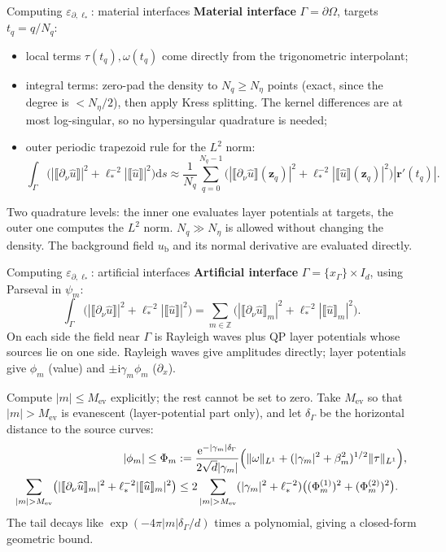 \documentclass[aspectratio=169]{beamer}
\newcommand{\ii}{\mathrm{i}}
\newcommand{\ee}{\mathrm{e}}
\newcommand{\dd}{\mathrm{d}}
\newcommand{\ZZ}{\mathbb{Z}}
\newcommand{\jump}[1]{\llbracket #1\rrbracket}
\newcommand{\eps}{\varepsilon_{\partial,\ell_*}}
\begin{document}
\begin{frame}{Computing $\eps$: material interfaces}
  \small
  \textbf{Material interface} $\Gamma=\partial\Omega$, targets $t_q=q/N_q$:
  \begin{itemize}
    \item local terms $\tau(t_q),\omega(t_q)$ come directly from the trigonometric
      interpolant;
    \item integral terms: zero-pad the density to $N_q\ge N_\eta$ points (exact, since
      the degree is $<N_\eta/2$), then apply Kress splitting. The kernel differences
      are at most log-singular, so no hypersingular quadrature is needed;
    \item outer periodic trapezoid rule for the $L^2$ norm:
      \[
        \int_\Gamma\bigl(|\jump{\partial_\nu\widehat u}|^2+\ell_*^{-2}|\jump{\widehat u}|^2\bigr)\dd s
        \approx\frac1{N_q}\sum_{q=0}^{N_q-1}\bigl(|\jump{\partial_\nu\widehat u}(\mathbf z_q)|^2
          +\ell_*^{-2}|\jump{\widehat u}(\mathbf z_q)|^2\bigr)|\boldsymbol r'(t_q)|.
      \]
  \end{itemize}
  Two quadrature levels: the inner one evaluates layer potentials at targets, the outer
  one computes the $L^2$ norm. $N_q\gg N_\eta$ is allowed without changing the density.
  The background field $u_{\mathrm b}$ and its normal derivative are evaluated directly.
\end{frame}

\begin{frame}{Computing $\eps$: artificial interfaces}
  \small
  \textbf{Artificial interface} $\Gamma=\{x_\Gamma\}\times I_d$, using Parseval in $\psi_m$:
  \[
    \int_\Gamma\bigl(|\jump{\partial_\nu\widehat u}|^2+\ell_*^{-2}|\jump{\widehat u}|^2\bigr)
    =\sum_{m\in\ZZ}\bigl(|\jump{\partial_\nu\widehat u}_m|^2+\ell_*^{-2}|\jump{\widehat u}_m|^2\bigr).
  \]
  On each side the field near $\Gamma$ is Rayleigh waves plus QP layer potentials whose
  sources lie on one side. Rayleigh waves give amplitudes directly; layer potentials
  give $\phi_m$ (value) and $\pm\ii\gamma_m\phi_m$ ($\partial_x$).

  \medskip
  Compute $|m|\le M_{\mathrm{ev}}$ explicitly; the rest cannot be set to zero. Take
  $M_{\mathrm{ev}}$ so that $|m|>M_{\mathrm{ev}}$ is evanescent (layer-potential part
  only), and let $\delta_\Gamma$ be the horizontal distance to the source curves:
  \begin{align*}
    |\phi_m|\le\Phi_m&:=\frac{\ee^{-|\gamma_m|\delta_\Gamma}}{2\sqrt d|\gamma_m|}
    \Bigl(\lVert\omega\rVert_{L^1}+(|\gamma_m|^2+\beta_m^2)^{1/2}\lVert\tau\rVert_{L^1}\Bigr),\\
    \sum_{|m|>M_{\mathrm{ev}}}\bigl(|\jump{\partial_\nu\widehat u}_m|^2+\ell_*^{-2}|\jump{\widehat u}_m|^2\bigr)
    &\le2\sum_{|m|>M_{\mathrm{ev}}}(|\gamma_m|^2+\ell_*^{-2})\bigl((\Phi_m^{(1)})^2+(\Phi_m^{(2)})^2\bigr).
  \end{align*}
  The tail decays like $\exp(-4\pi|m|\delta_\Gamma/d)$ times a polynomial, giving a
  closed-form geometric bound.
\end{frame}
\end{document}
